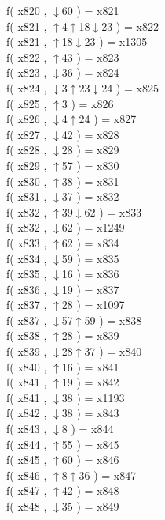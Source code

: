f( x820 , $\downarrow$60 ) = x821 \\
f( x821 , $\uparrow$4$\uparrow$18$\downarrow$23 ) = x822 \\
f( x821 , $\uparrow$18$\downarrow$23 ) = x1305 \\
f( x822 , $\uparrow$43 ) = x823 \\
f( x823 , $\downarrow$36 ) = x824 \\
f( x824 , $\downarrow$3$\uparrow$23$\downarrow$24 ) = x825 \\
f( x825 , $\uparrow$3 ) = x826 \\
f( x826 , $\downarrow$4$\uparrow$24 ) = x827 \\
f( x827 , $\downarrow$42 ) = x828 \\
f( x828 , $\downarrow$28 ) = x829 \\
f( x829 , $\uparrow$57 ) = x830 \\
f( x830 , $\uparrow$38 ) = x831 \\
f( x831 , $\downarrow$37 ) = x832 \\
f( x832 , $\uparrow$39$\downarrow$62 ) = x833 \\
f( x832 , $\downarrow$62 ) = x1249 \\
f( x833 , $\uparrow$62 ) = x834 \\
f( x834 , $\downarrow$59 ) = x835 \\
f( x835 , $\downarrow$16 ) = x836 \\
f( x836 , $\downarrow$19 ) = x837 \\
f( x837 , $\uparrow$28 ) = x1097 \\
f( x837 , $\downarrow$57$\uparrow$59 ) = x838 \\
f( x838 , $\uparrow$28 ) = x839 \\
f( x839 , $\downarrow$28$\uparrow$37 ) = x840 \\
f( x840 , $\uparrow$16 ) = x841 \\
f( x841 , $\uparrow$19 ) = x842 \\
f( x841 , $\downarrow$38 ) = x1193 \\
f( x842 , $\downarrow$38 ) = x843 \\
f( x843 , $\downarrow$8 ) = x844 \\
f( x844 , $\uparrow$55 ) = x845 \\
f( x845 , $\uparrow$60 ) = x846 \\
f( x846 , $\uparrow$8$\uparrow$36 ) = x847 \\
f( x847 , $\uparrow$42 ) = x848 \\
f( x848 , $\downarrow$35 ) = x849 \\

